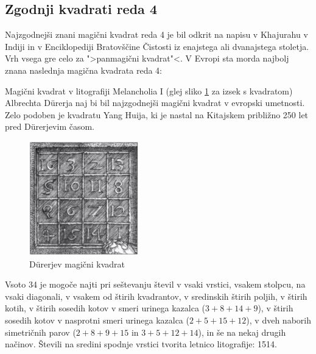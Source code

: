 \documentclass[a4paper,12pt]{article}
\begin{document}

\subsection{Zgodnji kvadrati reda 4}

Najzgodnejši znani magični kvadrat reda 4 je bil odkrit na napisu
v Khajurahu v Indiji in v Enciklopediji Bratovščine Čistosti iz enajstega
ali dvanajstega stoletja. Vrh vsega gre celo za ">panmagični kvadrat"<.
V Evropi sta morda najbolj znana naslednja magična kvadrata reda 4:

Magični kvadrat v litografiji Melancholia I (glej sliko \ref{fig:durer}
za izsek s kvadratom) Albrechta Dürerja naj bi bil najzgodnejši magični kvadrat
v evropski umetnosti. Zelo podoben je kvadratu Yang Huija, ki je nastal na Kitajskem
približno 250 let pred Dürerjevim časom. %



\begin{figure}[!ht]
   \caption{Dürerjev magični kvadrat}
   \label{fig:durer}
   \begin{center}
      \includegraphics[scale=1.3]{durer.png}
   \end{center}
\end{figure}

Vsoto 34 je mogoče najti pri seštevanju števil v vsaki vrstici, vsakem stolpcu,
na vsaki diagonali, v vsakem od štirih kvadrantov, v sredinskih štirih poljih,
v štirih kotih, v štirih sosedih kotov v smeri urinega kazalca ($3+8+14+9$), v
štirih sosedih kotov v nasprotni smeri urinega kazalca ($2+5+15+12$), v dveh naborih
simetričnih parov ($2+8+9+15$ in $3+5+12+14$), in še na nekaj drugih načinov.
Števili na sredini spodnje vrstici tvorita letnico litografije: 1514.
%
\end{document}
